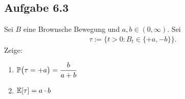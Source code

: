 \subsection{Aufgabe 6.3}
Sei $B$ eine Brownsche Bewegung und $a,b\in(0,\infty)$.
Sei
\begin{align*}
	\tau:=\Big\lbrace t>0:B_t\in\lbrace+a,-b\rbrace\Big\rbrace.
\end{align*}
Zeige:
\begin{enumerate}[label=\alph*)]
	\item $\begin{aligned}
		\P\big(\tau=+a\big)=\frac{b}{a+b}
	\end{aligned}$
	\item $\begin{aligned}
		\E[\tau]=a\cdot b
	\end{aligned}$
\end{enumerate}

